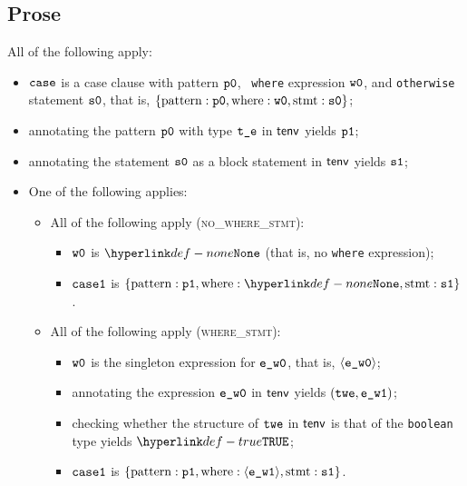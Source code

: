 \subsection{Prose}
All of the following apply:
\begin{itemize}
  \item $\texttt{case}$ is a case clause with pattern $\texttt{p0}$, \optional\ \texttt{where} expression $\texttt{w0}$,
        and \texttt{otherwise} statement $\texttt{s0}$, that is,
        $\{ \text{pattern}: \texttt{p0}, \text{where}: \texttt{w0}, \text{stmt}: \texttt{s0} \}$;
  \item annotating the pattern $\texttt{p0}$ with type $\texttt{t\_e}$ in $\textsf{tenv}$ yields $\texttt{p1}$\ProseOrTypeError;
  \item annotating the statement $\texttt{s0}$ as a block statement in $\textsf{tenv}$ yields $\texttt{s1}$\ProseOrTypeError;
  \item One of the following applies:
  \begin{itemize}
    \item All of the following apply (\textsc{no\_where\_stmt}):
    \begin{itemize}
      \item $\texttt{w0}$ is $\None$ (that is, no \texttt{where} expression);
      \item $\texttt{case1}$ is $\{ \CasePattern: \vpone, \CaseWhere: \None, \CaseStmt: \vsone \}$.
    \end{itemize}

    \item All of the following apply (\textsc{where\_stmt}):
    \begin{itemize}
      \item $\texttt{w0}$ is the singleton expression for $\texttt{e\_w0}$, that is, $\langle\texttt{e\_w0}\rangle$;
      \item annotating the expression $\texttt{e\_w0}$ in $\textsf{tenv}$ yields $(\texttt{twe}, \texttt{e\_w1})$\ProseOrTypeError;
      \item checking whether the structure of $\texttt{twe}$ in $\textsf{tenv}$ is that of the \texttt{boolean} type yields $\True$\ProseOrTypeError;
      \item $\texttt{case1}$ is $\{ \text{pattern}: \texttt{p1}, \text{where}: \langle\texttt{e\_w1}\rangle, \text{stmt}: \texttt{s1} \}$.
    \end{itemize}
  \end{itemize}
\end{itemize}

